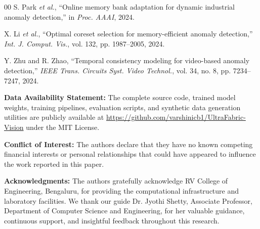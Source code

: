 \documentclass[journal]{IEEEtran}
\begin{document}
\begin{thebibliography}{00}
S. Park \textit{et al.}, ``Online memory bank adaptation for dynamic industrial anomaly detection,'' in \textit{Proc. AAAI}, 2024.

X. Li \textit{et al.}, ``Optimal coreset selection for memory-efficient anomaly detection,'' \textit{Int. J. Comput. Vis.}, vol. 132, pp. 1987--2005, 2024.

Y. Zhu and R. Zhao, ``Temporal consistency modeling for video-based anomaly detection,'' \textit{IEEE Trans. Circuits Syst. Video Technol.}, vol. 34, no. 8, pp. 7234--7247, 2024.

\end{thebibliography}

\vspace{12pt}
\noindent\textbf{Data Availability Statement:} The complete source code, trained model weights, training pipelines, evaluation scripts, and synthetic data generation utilities are publicly available at \url{https://github.com/varshinicb1/UltraFabric-Vision} under the MIT License.

\noindent\textbf{Conflict of Interest:} The authors declare that they have no known competing financial interests or personal relationships that could have appeared to influence the work reported in this paper.

\noindent\textbf{Acknowledgments:} The authors gratefully acknowledge RV College of Engineering, Bengaluru, for providing the computational infrastructure and laboratory facilities. We thank our guide Dr. Jyothi Shetty, Associate Professor, Department of Computer Science and Engineering, for her valuable guidance, continuous support, and insightful feedback throughout this research.
\end{document}
